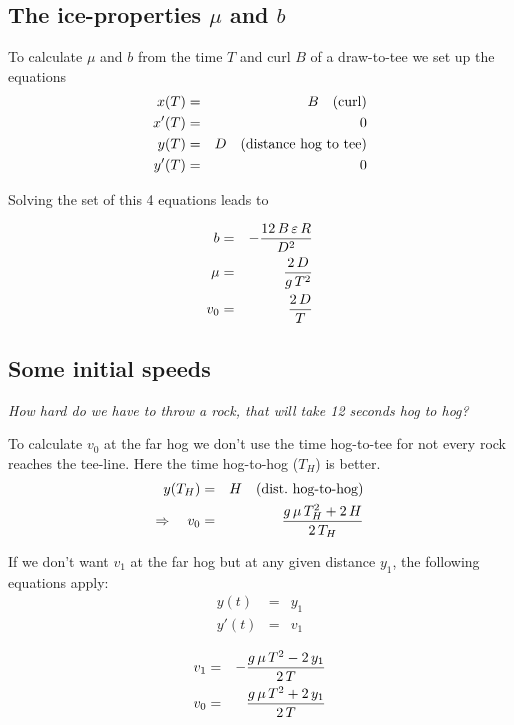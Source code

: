 \subsection{The ice-properties $ \mu $ and $ b $}
To calculate $ \mu $ and $ b $ from the time $ T $ and curl $ B $ of a draw-to-tee
we set up the equations
\begin{eqnarray}
\eqlab{dennyXTee}
x(T) &=& B \quad \mbox{(curl)} \\
x'(T) &=& 0 \\
\eqlab{dennyYTee}
y(T) &=& D \quad \mbox{(distance hog to tee)} \\
\eqlab{dennyYdtTee}
y'(T) &=& 0 
\end{eqnarray}

\noindent Solving the set of this 4 equations leads to 

\begin{eqnarray}
b	&=&	-{{12\,B\,\varepsilon\,R}\over{D^2}} \\
\mu &=&	{{2\,D}\over{g\,T^2}} \\
v_{0} &=&	{{2\,D}\over{T}}
\end{eqnarray}

\subsection{Some initial speeds}

\textit{How hard do we have to throw a rock, that will take 12 seconds hog to
hog?}

To calculate $v_0$ at the far hog we don't use the time hog-to-tee for not
every rock reaches the tee-line. Here the time hog-to-hog ($T_H$) is better.
\begin{eqnarray}
y(T_H) &=& H \quad \mbox{(dist.~hog-to-hog)} \\
\Rightarrow \quad v_0 &=& {{g\,\mu\,T_H^2+2\,H}\over{2\,T_H}}
\end{eqnarray}

If we don't want $v_1$ at the far hog but at any given distance $y_1$, the following 
equations apply:
\begin{eqnarray}
y(t)  &=& y_1 \\
y'(t) &=& v_1 
\end{eqnarray}

\begin{eqnarray}
v_1 &=& -{{g\,\mu\,T^2-2\,y_{1}}\over{2\,T}} \\
v_0 &=& {{g \,\mu\,T^2+2\,y_{1}}\over{2\,T}}
\end{eqnarray}

